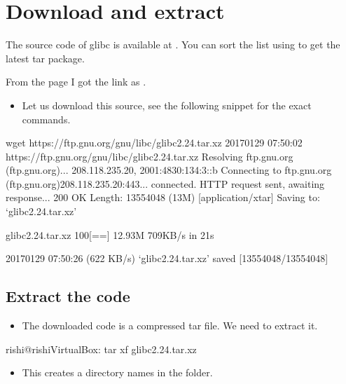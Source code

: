 \documentclass[letterpaper,10pt,english]{sphinxmanual}
\begin{document}
\section{Download and extract }
\label{\detokenize{03_glibc:download-and-extract-glibc}}
The source code of glibc is available at . You
can sort the list using  to get the latest tar package.

From the page I got the link as .
\begin{itemize}
\item {} 
Let us download this source, see the following snippet for the exact commands.

\end{itemize}

\begin{sphinxVerbatim}[commandchars=\\\{\}]
\PYGZdl{} wget https://ftp.gnu.org/gnu/libc/glibc\PYGZhy{}2.24.tar.xz
\PYGZhy{}\PYGZhy{}2017\PYGZhy{}01\PYGZhy{}29 07:50:02\PYGZhy{}\PYGZhy{}  https://ftp.gnu.org/gnu/libc/glibc\PYGZhy{}2.24.tar.xz
Resolving ftp.gnu.org (ftp.gnu.org)... 208.118.235.20, 2001:4830:134:3::b
Connecting to ftp.gnu.org (ftp.gnu.org)\textbar{}208.118.235.20\textbar{}:443... connected.
HTTP request sent, awaiting response... 200 OK
Length: 13554048 (13M) [application/x\PYGZhy{}tar]
Saving to: ‘glibc\PYGZhy{}2.24.tar.xz’

glibc\PYGZhy{}2.24.tar.xz                     100\PYGZpc{}[==\PYGZgt{}]  12.93M   709KB/s    in 21s

2017\PYGZhy{}01\PYGZhy{}29 07:50:26 (622 KB/s) \PYGZhy{} ‘glibc\PYGZhy{}2.24.tar.xz’ saved [13554048/13554048]
\end{sphinxVerbatim}


\subsection{Extract the code}
\label{\detokenize{03_glibc:extract-the-code}}\begin{itemize}
\item {} 
The downloaded code is a compressed tar file. We need to extract it.

\end{itemize}

\begin{sphinxVerbatim}[commandchars=\\\{\}]
rishi@rishi\PYGZhy{}VirtualBox:\PYGZti{}\PYGZdl{} tar \PYGZhy{}xf glibc\PYGZhy{}2.24.tar.xz
\end{sphinxVerbatim}
\begin{itemize}
\item {} 
This creates a directory names  in the folder.

\end{itemize}
\end{document}
